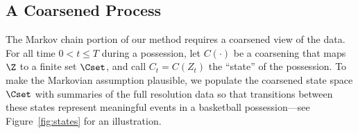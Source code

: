 \documentclass[EPV_JASA.tex]{subfiles}
\begin{document}




\subsection{A Coarsened Process}\label{subsec:multiCoarse}
The Markov chain portion of our method requires a coarsened view of the data. For all time $0 < t \leq T$ during a possession, let $C(\cdot)$ be a coarsening that maps $\Z$ to a finite set $\Cset$, and call $C_t = C(Z_t)$ the ``state'' of the possession. To make the Markovian assumption plausible, we populate the coarsened state space $\Cset$ with summaries of the full resolution data so that transitions between these states represent meaningful events in a basketball possession---see Figure~\ref{fig:states} for an illustration.
\end{document}
